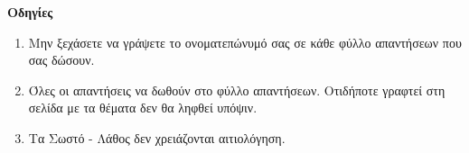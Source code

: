 \documentclass[12pt]{article}
\begin{document}
\vfill
 \textbf{Οδηγίες}
 \begin{enumerate}
   \item Μην ξεχάσετε να γράψετε το ονοματεπώνυμό σας σε κάθε φύλλο απαντήσεων που σας δώσουν.
   \item Όλες οι απαντήσεις να δωθούν στο φύλλο απαντήσεων. Οτιδήποτε γραφτεί στη σελίδα με τα θέματα δεν θα ληφθεί υπόψιν.
   \item Τα Σωστό - Λάθος δεν χρειάζονται αιτιολόγηση.
 \end{enumerate}
\end{document}
